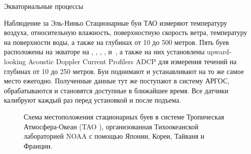 \begin{chapter}{Экваториальные процессы}
\begin{section}{Наблюдение за Эль-Ниньо}
Стационарные буи ТАО измеряют температуру воздуха, относительную
влажность, поверхностную скорость ветра, температуру на поверхности
воды, а также на глубинах от 10 до 500 метров. Пять буев расположены
на экваторе на , , ,
, и~, а также на них установлены
upward-looking Acoustic Doppler Current Profilers ADCP для измерения
течений на глубинах от 10 до 250 метров. Буи поднимают и устанавливают
на то же самое место ежегодно. Полученные данные тут же поступают в
систему АРГОС, обрабатываются и становятся доступные в ближайшее
время. Все датчики калибруют каждый раз перед установкой и после
подъема.
%

\begin{figure}[t!]
\caption{Схема местоположения стационарных буев в системе Тропическая
Атмосфера-Океан (TAO ), организованная Тихоокеанской лабораторией NOAA
с помощью Японии, Кореи, Тайваня и Франции.}
\label{fig:TaoArray}
\vspace{-3ex}
\end{figure}
%
%


\end{section}
\end{chapter}
